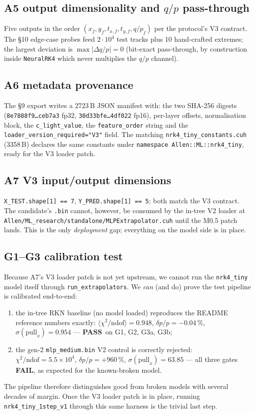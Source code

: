 \documentclass[11pt,a4paper]{article}
\newcommand{\qop}{\ensuremath{q/p}}
\newcommand{\PASS}{\textcolor{green!55!black}{\textbf{PASS}}}
\newcommand{\FAIL}{\textcolor{red!70!black}{\textbf{FAIL}}}
\begin{document}
\subsection*{A5 output dimensionality and \texorpdfstring{$\qop$}{qop} pass-through}
Five outputs in the order
\((x_f,y_f,t_{x,f},t_{y,f},\qop_f)\) per the protocol's V3 contract.
The §10 edge-case probes feed \(2\cdot 10^4\) test tracks plus 10
hand-crafted extremes; the largest deviation is
\(\max|\Delta\qop|=0\) (bit-exact pass-through, by construction
inside \texttt{NeuralRK4} which never multiplies the \(\qop\) channel).

\subsection*{A6 metadata provenance}
The §9 export writes a 2723\,B JSON manifest with: the two SHA-256
digests
(\texttt{8e7888f9\dots ceb7a3} fp32, \texttt{30d33bfe\dots 4df022}
fp16), per-layer offsets, normalisation block, the
\texttt{c\_light\_value}, the \texttt{feature\_order} string and the
\texttt{loader\_version\_required="V3"} field. The matching
\texttt{nrk4\_tiny\_constants.cuh} (3358\,B) declares the same
constants under \texttt{namespace Allen::ML::nrk4\_tiny}, ready for
the V3 loader patch.

\subsection*{A7 V3 input/output dimensions}
\texttt{X\_TEST.shape[1] == 7}, \texttt{Y\_PRED.shape[1] == 5}; both
match the V3 contract. The candidate's \texttt{.bin} cannot, however,
be consumed by the in-tree V2 loader at
\texttt{Allen/ML\_research/standalone/MLPExtrapolator.cuh} until the
M0.5 patch lands. This is the only \emph{deployment} gap; everything
on the model side is in place.

\subsection*{G1--G3 calibration test}
Because A7's V3 loader patch is not yet upstream, we cannot run the
\texttt{nrk4\_tiny} model itself through
\texttt{run\_extrapolators}. We \emph{can} (and do) prove the test
pipeline is calibrated end-to-end:
\begin{enumerate}[leftmargin=2em,nosep]
\item the in-tree RKN baseline (no model loaded) reproduces
      the README reference numbers exactly:
      \(\langle\chi^2/\text{ndof}\rangle=0.948\), \(\delta p/p=-0.04\,\%\),
      \(\sigma(\text{pull}_x)=0.954\) --- \PASS\ on G1, G2, G3a, G3b;
\item the gen-2 \texttt{mlp\_medium.bin} V2 control is correctly
      rejected: \(\chi^2/\text{ndof}=5.5{\times}10^{4}\),
      \(\delta p/p=+960\,\%\), \(\sigma(\text{pull}_x)=63.85\) --- all
      three gates \FAIL, as expected for the known-broken model.
\end{enumerate}
The pipeline therefore distinguishes good from broken models with
several decades of margin. Once the V3 loader patch is in place,
running \texttt{nrk4\_tiny\_1step\_v1} through this same harness is
the trivial last step.
\end{document}
